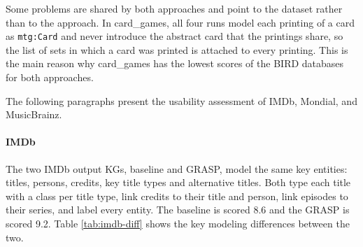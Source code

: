 Some problems are shared by both approaches and point to the dataset rather than to the approach. In card\_games, all four runs model each printing of a card as \texttt{mtg:Card} and never introduce the abstract card that the printings share, so the list of sets in which a card was printed is attached to every printing. This is the main reason why card\_games has the lowest scores of the BIRD databases for both approaches.

The following paragraphs present the usability assessment of IMDb, Mondial, and MusicBrainz.

\paragraph{IMDb}\label{sec:results-imdb}
The two IMDb output KGs, baseline and GRASP, model the same key entities: titles, persons, credits, key title types and alternative titles. Both type each title with a class per title type, link credits to their title and person, link episodes to their series, and label every entity. The baseline is scored 8.6 and the GRASP is scored 9.2. Table \ref{tab:imdb-diff} shows the key modeling differences between the two.

